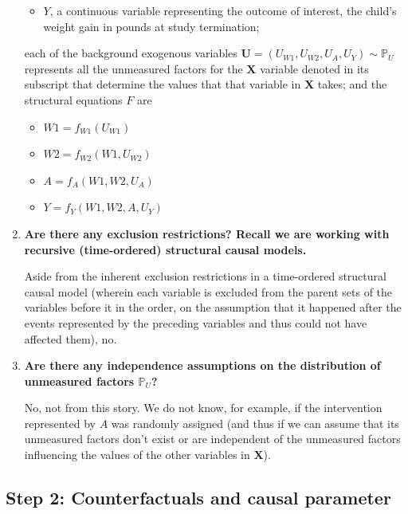 \documentclass{article}\usepackage[]{graphicx}\usepackage[]{xcolor}
\begin{document}
\begin{enumerate}[label=\textbf{\alph*.}]
\begin{itemize}
      \item $Y$, a continuous variable representing the outcome of interest, the child's weight gain in pounds at study termination;
      
    \end{itemize}
    
    each of the background exogenous variables $\bm{U} = (U_{W1}, U_{W2}, U_{A}, U_{Y}) \sim \mathbb{P}_U$ represents all the unmeasured factors for the $\bm{X}$ variable denoted in its subscript that determine the values that that variable in $\bm{X}$ takes; and the structural equations $F$ are
    
    \begin{itemize}
    
      \item $W1 = f_{W1}(U_{W1})$
      
      \item $W2 = f_{W2}(W1, U_{W2})$
      
      \item $A = f_{A}(W1, W2, U_{A})$
      
      \item $Y = f_{Y}(W1, W2, A, U_{Y})$
      
    \end{itemize}


    \item \textbf{Are there any exclusion restrictions? Recall we are working with recursive (time-ordered) structural causal models.}
    
    Aside from the inherent exclusion restrictions in a time-ordered structural causal model (wherein each variable is excluded from the parent sets of the variables before it in the order, on the assumption that it happened after the events represented by the preceding variables and thus could not have affected them), no.
    
    \item \textbf{Are there any independence assumptions on the distribution of unmeasured factors $\mathbb{P}_U$?}
    
    No, not from this story. We do not know, for example, if the intervention represented by $A$ was randomly assigned (and thus if we can assume that its unmeasured factors don't exist or are independent of the unmeasured factors influencing the values of the other variables in $\bm{X}$).

  \end{enumerate}
  
  \subsection{Step 2: Counterfactuals and causal parameter}
  
\end{document}
